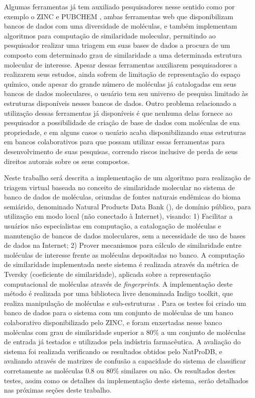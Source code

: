 Algumas ferramentas já tem auxiliado pesquisadores nesse sentido como por exemplo o ZINC \cite{irwin2005zinc} e PUBCHEM \cite{li2010pubchem}, ambas ferramentas web que disponibilizam bancos de dados com uma diversidade de moléculas, e também implementam algoritmos para computação de similaridade molecular, permitindo ao pesquisador realizar uma triagem em suas bases de dados a procura de um composto com determinado grau de similaridade a uma determinada estrutura molecular de interesse. Apesar dessas ferramentas auxiliarem pesquisadores a realizarem seus estudos, ainda sofrem de limitação de representação do espaço químico, onde apesar do grande número de moléculas já catalogadas em seus bancos de dados moleculares, o usuário tem seu universo de pesquisa limitado às estruturas disponíveis nesses bancos de dados. Outro problema relacionado a utilização dessas ferramentas já disponíveis é que nenhuma delas fornece ao pesquisador a possibilidade de criação de base de dados com moléculas de sua propriedade, e em alguns casos o usuário acaba disponibilizando suas estruturas em bancos colaborativos para que possam utilizar essas ferramentas para desenvolvimento de suas pesquisas, correndo riscos inclusive de perda de seus direitos autorais sobre os  seus compostos.

Neste trabalho será descrita a implementação de um algoritmo para  realização de triagem virtual baseada no conceito de similaridade molecular no sistema de banco de dados de moléculas, oriundas de fontes naturais endêmicas do bioma semiárido, denominado Natural Products Data Bank (), de domínio público, para utilização em modo local (não conectado à Internet), visando: 1) Facilitar a usuários não especialistas em computação, a catalogação de moléculas e manutenção de bancos de dados moleculares, sem a necessidade de uso de bases de dados na Internet; 2) Prover mecanismos para cálculo de similaridade entre moléculas de interesse frente as moléculas depositadas no banco. A computação de similaridade implementada neste sistema é realizada através da métrica de Tversky (coeficiente de similaridade), aplicada sobre a representação computacional de moléculas através de \textit{fingerprints}. A implementação deste método é realizada por uma biblioteca livre denominada Indigo toolkit, que realiza manipulação de moléculas e sub-estruturas \cite{pavlov2011indigo}. Para os testes foi criado um banco de dados para o sistema com um conjunto de moléculas de um banco colaborativo disponibilizado pelo ZINC, e foram enxertadas nesse banco moléculas com grau de similaridade superior a 80\% a um conjunto de moléculas de entrada já testados e utilizados pela indústria farmacêutica. A avaliação do sistema foi realizada verificando os resultados obtidos pelo NatProDB, e avaliando através de matrizes de confusão a capacidade do sistema de classificar corretamente as moléculas 0.8 ou 80\% similares ou não. Os resultados destes testes, assim como os detalhes da implementação deste sistema, serão detalhados nas próximas seções deste trabalho.


